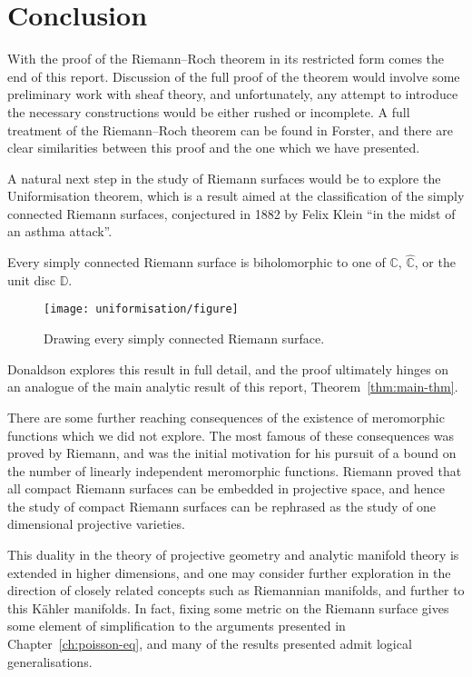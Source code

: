 \chapter*{Conclusion}
With the proof of the Riemann--Roch theorem in its restricted form comes the end
of this report. Discussion of the full proof of the theorem would involve some
preliminary work with sheaf theory, and unfortunately, any attempt to introduce
the necessary constructions would be either rushed or incomplete. A full
treatment of the Riemann--Roch theorem can be found in
Forster, and there are clear similarities
between this proof and the one which we have presented.

A natural next step in the study of Riemann surfaces would be to explore the
Uniformisation theorem, which is a result aimed at the classification of the
simply connected Riemann surfaces, conjectured in 1882 by Felix Klein ``in the
midst of an asthma attack''.

\begin{theorem}
	Every simply connected Riemann surface is biholomorphic to one of $ \mathbb{C}
	$, $ \hat{\mathbb{C}} $, or the unit disc $ \mathbb{D} $.
\end{theorem}

\begin{figure*}
	\centering
	\texttt{[image: uniformisation/figure]}
	\caption{Drawing every simply connected Riemann surface.}
\end{figure*}

Donaldson explores this result
in full detail, and the proof ultimately hinges on an analogue of the main
analytic result of this report, Theorem~\ref{thm:main-thm}.

There are some further reaching consequences of the existence of meromorphic
functions which we did not explore. The most famous of these consequences was
proved by Riemann, and was the initial motivation for his pursuit of a bound on
the number of linearly independent meromorphic functions. Riemann proved that
all compact Riemann surfaces can be embedded in projective space, and hence the
study of compact Riemann surfaces can be rephrased as the study of one
dimensional projective varieties.

This duality in the theory of projective geometry and analytic manifold theory
is extended in higher dimensions, and one may consider further exploration in
the direction of closely related concepts such as Riemannian manifolds, and
further to this K\"ahler manifolds. In fact, fixing some metric on the Riemann
surface gives some element of simplification to the arguments presented in
Chapter~\ref{ch:poisson-eq}, and many of the results presented admit logical
generalisations.


